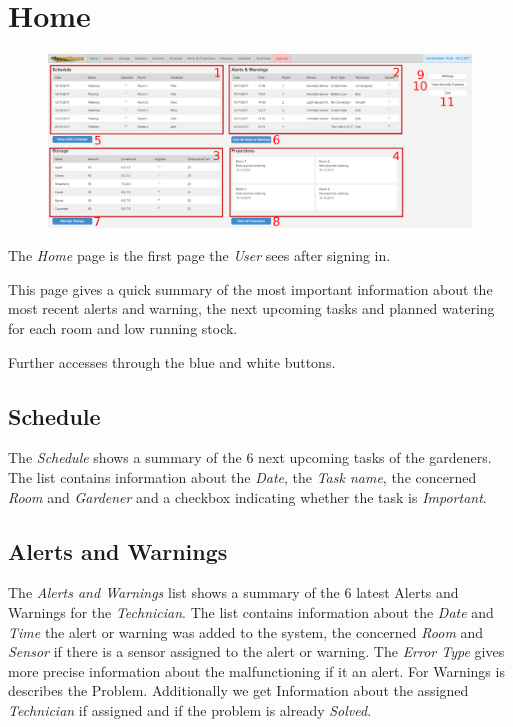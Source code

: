 \section{Home}
\label{sec:appendix_Home}
\begin{figure}
\includegraphics[width=1\textwidth]{images/mockup_home_eps.eps}
\end{figure}

The \emph{Home} page is the first page the \emph{User} sees after signing in.

This page gives a quick summary of the most important information about the most
recent alerts and warning, the next upcoming tasks and planned watering for each
room and low running stock. 

Further accesses through the blue and white buttons.

\subsection{Schedule}
The \emph{Schedule} shows a summary of the 6 next upcoming tasks of the
gardeners. The list contains information about the \emph{Date}, the \emph{Task
name}, the concerned \emph{Room} and \emph{Gardener} and a checkbox indicating
whether the task is \emph{Important}.

\subsection{Alerts and Warnings}
The \emph{Alerts and Warnings} list shows a summary of the 6 latest Alerts and
Warnings for the \emph{Technician}. The list contains information about the
\emph{Date} and \emph{Time} the alert or warning was added to the system, the
concerned \emph{Room} and \emph{Sensor} if there is a sensor assigned to the
alert or warning. The \emph{Error Type} gives more precise information about the
malfunctioning if it an alert. For Warnings is describes the Problem.
Additionally we get Information about the assigned \emph{Technician} if assigned
and if the problem is already \emph{Solved}.

